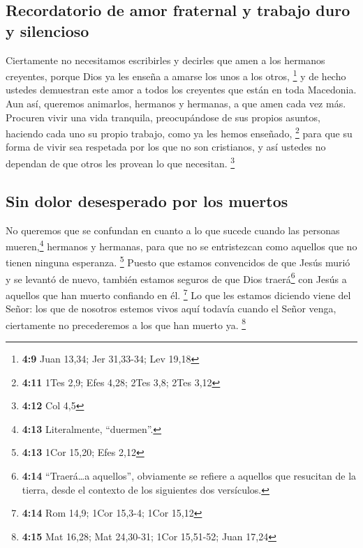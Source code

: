 \hypertarget{recordatorio-de-amor-fraternal-y-trabajo-duro-y-silencioso}{%
\subsection{Recordatorio de amor fraternal y trabajo duro y
silencioso}\label{recordatorio-de-amor-fraternal-y-trabajo-duro-y-silencioso}}

 Ciertamente no necesitamos escribirles y decirles que
amen a los hermanos creyentes, porque Dios ya les enseña a amarse los
unos a los otros, \footnote{\textbf{4:9} Juan 13,34; Jer 31,33-34; Lev
  19,18}  y de hecho ustedes demuestran este amor a todos
los creyentes que están en toda Macedonia. Aun así, queremos animarlos,
hermanos y hermanas, a que amen cada vez más.  Procuren
vivir una vida tranquila, preocupándose de sus propios asuntos, haciendo
cada uno su propio trabajo, como ya les hemos enseñado, \footnote{\textbf{4:11}
  1Tes 2,9; Efes 4,28; 2Tes 3,8; 2Tes 3,12}  para que su
forma de vivir sea respetada por los que no son cristianos, y así
ustedes no dependan de que otros les provean lo que necesitan.
\footnote{\textbf{4:12} Col 4,5}

\hypertarget{sin-dolor-desesperado-por-los-muertos}{%
\subsection{Sin dolor desesperado por los
muertos}\label{sin-dolor-desesperado-por-los-muertos}}

 No queremos que se confundan en cuanto a lo que sucede
cuando las personas mueren,\footnote{\textbf{4:13} Literalmente,
  ``duermen''.} hermanos y hermanas, para que no se entristezcan como
aquellos que no tienen ninguna esperanza. \footnote{\textbf{4:13} 1Cor
  15,20; Efes 2,12}  Puesto que estamos convencidos de
que Jesús murió y se levantó de nuevo, también estamos seguros de que
Dios traerá\footnote{\textbf{4:14} ``Traerá\ldots a aquellos'',
  obviamente se refiere a aquellos que resucitan de la tierra, desde el
  contexto de los siguientes dos versículos.} con Jesús a aquellos que
han muerto confiando en él. \footnote{\textbf{4:14} Rom 14,9; 1Cor
  15,3-4; 1Cor 15,12}  Lo que les estamos diciendo viene
del Señor: los que de nosotros estemos vivos aquí todavía cuando el
Señor venga, ciertamente no precederemos a los que han muerto ya.
\footnote{\textbf{4:15} Mat 16,28; Mat 24,30-31; 1Cor 15,51-52; Juan
  17,24}

